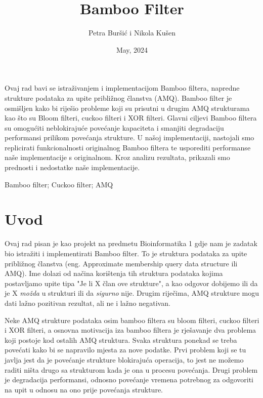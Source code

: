 \documentclass[seminarskirad]{fer}
\title{Bamboo Filter}
\author{Petra Buršić i Nikola Kušen}
\date{May, 2024}
\begin{document}
	
	\maketitle
	
	
	
	\begin{sazetak}
		Ovaj rad bavi se istraživanjem i implementacijom Bamboo filtera, napredne strukture podataka za upite približnog članstva (AMQ). Bamboo filter je osmišljen kako bi riješio probleme koji su prisutni u drugim AMQ strukturama kao što su Bloom filteri, cuckoo filteri i XOR filteri. Glavni ciljevi Bamboo filtera su omogućiti neblokirajuće povećanje kapaciteta i smanjiti degradaciju performansi prilikom povećanja strukture. U našoj implementaciji, nastojali smo replicirati funkcionalnosti originalnog Bamboo filtera te usporediti performanse naše implementacije s originalnom. Kroz analizu rezultata, prikazali smo prednosti i nedostatke naše implementacije.
	\end{sazetak}
	
	\begin{kljucnerijeci}
		Bamboo filter; Cuckoo filter; AMQ
	\end{kljucnerijeci}
	
	\tableofcontents
	
	\chapter{Uvod}
	\label{pog:uvod}
	
	Ovaj rad pisan je kao projekt na predmetu Bioinformatika 1 gdje nam je zadatak bio istražiti i implementirati Bamboo filter. To je struktura podataka za upite približnog članstva (eng. Approximate membership query data structure ili AMQ). Ime dolazi od načina korištenja tih struktura podataka kojima postavljamo upite tipa "Je li X član ove strukture", a kao odgovor dobijemo ili da je X \textit{možda} u strukturi ili da \textit{sigurno} nije. Drugim riječima, AMQ strukture mogu dati lažno pozitivan rezultat, ali ne i lažno negativan.
	
	Neke AMQ strukture podataka osim bamboo filtera su bloom filteri, cuckoo filteri i XOR filteri, a osnovna motivacija iza bamboo filtera je rješavanje dva problema koji postoje kod ostalih AMQ struktura. Svaka struktura ponekad se treba povećati kako bi se napravilo mjesta za nove podatke. Prvi problem koji se tu javlja jest da je povećanje strukture blokirajuća operacija, to jest ne možemo raditi ništa drugo sa strukturom kada je ona u procesu povećanja. Drugi problem je degradacija performansi, odnosno povećanje vremena potrebnog za odgovoriti na upit u odnosu na ono prije povećanja strukture.
	
\end{document}
